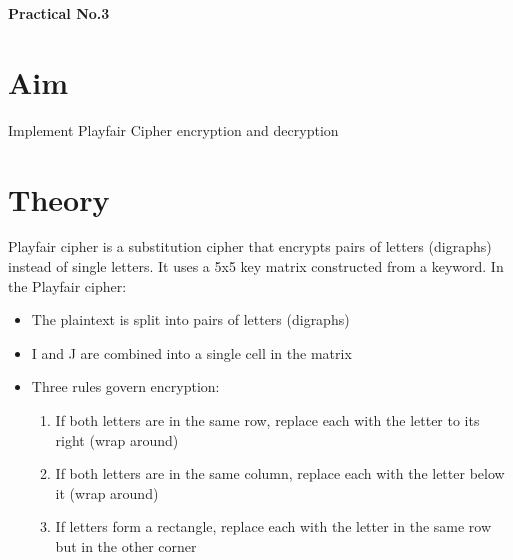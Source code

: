 \documentclass[12pt,a4paper]{article}
\begin{document}
\begin{center}
\fontsize{16}{18}\selectfont \textbf{Practical No.3}
\end{center}

\section*{Aim}
\fontsize{12}{14}\selectfont
Implement Playfair Cipher encryption and decryption

\section*{Theory}
Playfair cipher is a substitution cipher that encrypts pairs of letters (digraphs) instead of single letters. It uses a 5x5 key matrix constructed from a keyword. In the Playfair cipher:
\begin{itemize}
    \item The plaintext is split into pairs of letters (digraphs)
    \item I and J are combined into a single cell in the matrix
    \item Three rules govern encryption:
    \begin{enumerate}
        \item If both letters are in the same row, replace each with the letter to its right (wrap around)
        \item If both letters are in the same column, replace each with the letter below it (wrap around)
        \item If letters form a rectangle, replace each with the letter in the same row but in the other corner
    \end{enumerate}
\end{itemize}

\end{document}
